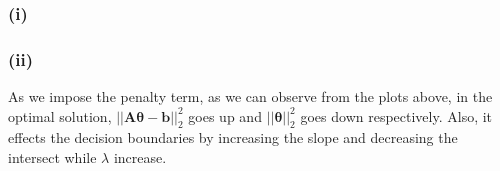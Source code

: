 \documentclass[11pt]{article}
\begin{document}
\subsubsection*{(i)}
\begin{figure}[h]
	\centering
\end{figure}
\subsubsection*{(ii)}
As we impose the penalty term, as we can observe from the plots above, in the optimal solution, $||\pmb{A\theta}-\pmb{b}||^2_2$ goes up and $||\pmb{\theta}||^2_2$ goes down respectively. Also, it effects the decision boundaries by increasing the slope and decreasing the intersect while $\lambda$ increase.
\end{document}
